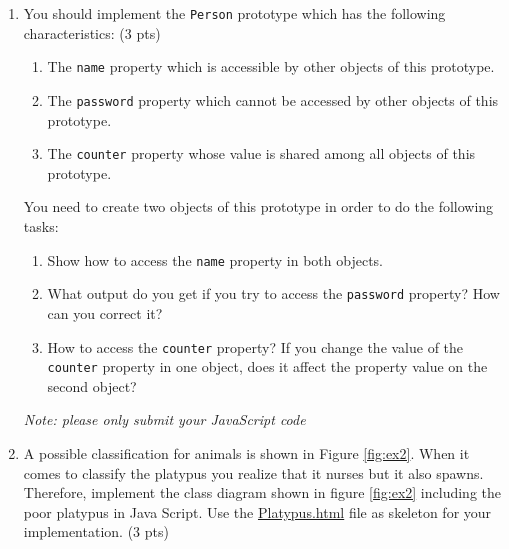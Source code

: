 \documentclass [11pt, a4wide, twoside]{article}
\begin{document}
\begin{enumerate}
\item You should implement the \texttt{Person} prototype which has the following characteristics: (3 pts)

\begin{enumerate}
   \item The \texttt{name} property which is accessible by other objects of this prototype.
   \item The \texttt{password} property which cannot be accessed by other objects of this prototype.
   \item The \texttt{counter} property whose value is shared among all objects of this prototype.
 \end{enumerate}

You need to create two objects of this prototype in order to do the following tasks:

\begin{enumerate}
   \item Show how to access the \texttt{name} property in both objects.
   \item What output do you get if you try to access the \texttt{password} property? How can you correct it?
   \item How to access the \texttt{counter} property? If you change the value of the \texttt{counter} property in one object, does it affect the property value on the second object?
 \end{enumerate}

\emph{Note: please only submit your JavaScript code}

\vspace{0.5cm}

\solution{}




\item A possible classification for animals is shown in Figure \ref{fig:ex2}. When it comes to classify the platypus you realize that it nurses but it also spawns. Therefore, implement the class diagram shown in figure \ref{fig:ex2} including the poor platypus in Java Script. Use the \href{http://scg.unibe.ch/download/lectures/pl-exercise21/Platypus.html}{Platypus.html} file as skeleton for your implementation. (3 pts)


\end{enumerate}
\end{document}
